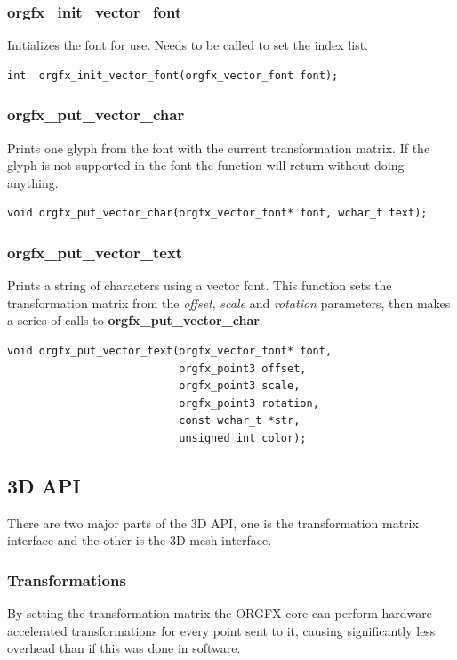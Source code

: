 \documentclass[10pt,a4paper]{article}
\begin{document}
\subsubsection{orgfx\_init\_vector\_font}
Initializes the font for use. Needs to be called to set the index list.
\begin{lstlisting}
int  orgfx_init_vector_font(orgfx_vector_font font);
\end{lstlisting}

\subsubsection{orgfx\_put\_vector\_char}
Prints one glyph from the font with the current transformation matrix. If the glyph is not supported in the font the function will return without doing anything.
\begin{lstlisting}
void orgfx_put_vector_char(orgfx_vector_font* font, wchar_t text);
\end{lstlisting}

\subsubsection{orgfx\_put\_vector\_text}
Prints a string of characters using a vector font. This function sets the transformation matrix from the \textit{offset}, \textit{scale} and \textit{rotation} parameters, then makes a series of calls to \textbf{orgfx\_put\_vector\_char}.
\begin{lstlisting}
void orgfx_put_vector_text(orgfx_vector_font* font,
                           orgfx_point3 offset,
                           orgfx_point3 scale,
                           orgfx_point3 rotation,
                           const wchar_t *str,
                           unsigned int color);
\end{lstlisting}

\subsection{3D API}
There are two major parts of the 3D API, one is the transformation matrix interface and the other is the 3D mesh interface.

\subsubsection{Transformations}
By setting the transformation matrix the ORGFX core can perform hardware accelerated transformations for every point sent to it, causing significantly less overhead than if this was done in software.
\end{document}

